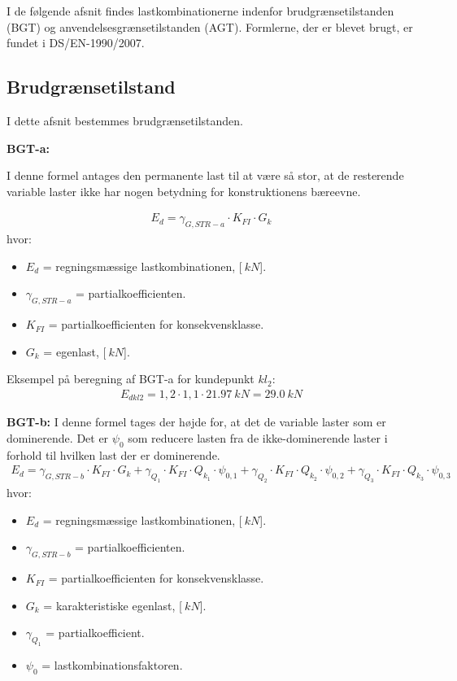 I de følgende afsnit findes lastkombinationerne indenfor brudgrænsetilstanden (BGT) og anvendelsesgrænsetilstanden (AGT). Formlerne, der er blevet brugt, er fundet i DS/EN-1990/2007.

\subsection{Brudgrænsetilstand}
I dette afsnit bestemmes brudgrænsetilstanden.  

\textbf{BGT-a:}

I denne formel antages den permanente last til at være så stor, at de resterende variable laster ikke har nogen betydning for konstruktionens bæreevne.

\begin{align*}
E_d = \gamma_{G,STR-a} \cdot K_{FI} \cdot G_k
\end{align*}
hvor:
\begin{itemize}
\item $E_d$ = regningsmæssige lastkombinationen, [$\SI{}{kN}$].
\item  $\gamma_{G,STR-a}$ = partialkoefficienten. 
\item $K_{FI}$ = partialkoefficienten for konsekvensklasse.
\item $G_k$ = egenlast, [$\SI{}{kN}$].
\end{itemize}

Eksempel på beregning af BGT-a for kundepunkt $ kl_{2} $:
\begin{align*}
E_{dkl2} = 1,2 \cdot 1,1 \cdot \SI{21,97}{kN} = \SI{29,0}{kN}
\end{align*}



\textbf{BGT-b:}
I denne formel tages der højde for, at det de variable laster som er dominerende. Det er $\psi_{0}$ som reducere lasten fra de ikke-dominerende laster i forhold til hvilken last der er dominerende. 
\begin{align*}
E_{d} = \gamma_{G,STR-b} \cdot K_{FI} \cdot G_k + \gamma_{Q_1} \cdot K_{FI} \cdot Q_{k_1} \cdot \psi_{0,1} + \gamma_{Q_2} \cdot K_{FI} \cdot Q_{k_2} \cdot \psi_{0,2} + \gamma_{Q_3} \cdot K_{FI} \cdot Q_{k_3} \cdot \psi_{0,3}
\end{align*}
hvor:
\begin{itemize}
\item $E_d$ = regningsmæssige lastkombinationen, [$\SI{}{kN}$].
\item $\gamma_{G,STR-b}$ = partialkoefficienten.
\item $K_{FI}$ = partialkoefficienten for konsekvensklasse.
\item $G_k$ = karakteristiske egenlast, [$\SI{}{kN}$].
\item $\gamma_{Q_{1}}$ = partialkoefficient.
\item $\psi_{0}$ = lastkombinationsfaktoren.
\end{itemize}

